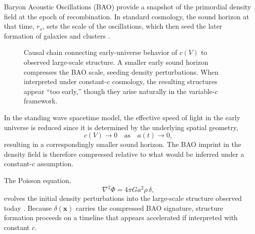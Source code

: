 \documentclass[12pt]{article}
\begin{document}
Baryon Acoustic Oscillations (BAO) provide a snapshot of the primordial density field at the epoch of recombination. In standard cosmology, the sound horizon at that time, $r_s$, sets the scale of the oscillations, which then seed the later formation of galaxies and clusters \cite{eisenstein2005,white2005}.  

\begin{figure}[h!]
\centering
{}
\caption{Causal chain connecting early-universe behavior of $c(V)$ to observed large-scale structure. 
A smaller early sound horizon compresses the BAO scale, seeding density perturbations. 
When interpreted under constant-$c$ cosmology, the resulting structures appear ``too early,'' though they arise naturally in the variable-$c$ framework.}
\label{fig:BAO_flow}
\end{figure}

In the standing wave spacetime model, the effective speed of light in the early universe is reduced since it is determined by the underlying spatial geometry,
\begin{equation}
c(V) \to 0 \quad \text{as} \quad a(t) \to 0,
\end{equation}
resulting in a correspondingly smaller sound horizon. The BAO imprint in the density field is therefore compressed relative to what would be inferred under a constant-$c$ assumption.

The Poisson equation,
\begin{equation}
\nabla^2 \Phi = 4 \pi G a^2 \rho \, \delta,
\end{equation}
evolves the initial density perturbations into the large-scale structure observed today \cite{peebles1980}. Because $\delta(\mathbf{x})$ carries the compressed BAO signature, structure formation proceeds on a timeline that appears accelerated if interpreted with constant $c$. 
\end{document}
